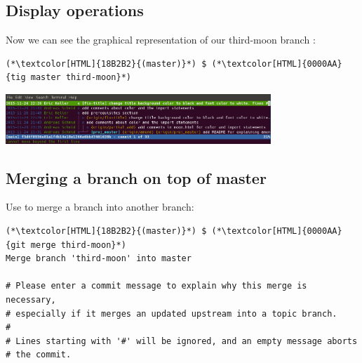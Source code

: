 \subsection{Display operations}
\begin{frame}[fragile]
  \subslidetitle

  Now we can see the graphical representation of our third-moon branch :
  \begin{lstlisting}
(*\textcolor[HTML]{18B2B2}{(master)}*) $ (*\textcolor[HTML]{0000AA}{tig master third-moon}*)
\end{lstlisting}

  \vspace{1em}

  \centerline{\includegraphics[width=10cm]{../screen/tig-fix-title-rebase-master.png}}

\end{frame}
\subsection{Merging a branch on top of master}
\begin{frame}[fragile]
  \subslidetitle

  Use  to merge a branch into another branch:

  \begin{lstlisting}
(*\textcolor[HTML]{18B2B2}{(master)}*) $ (*\textcolor[HTML]{0000AA}{git merge third-moon}*)
Merge branch 'third-moon' into master

# Please enter a commit message to explain why this merge is necessary,
# especially if it merges an updated upstream into a topic branch.
#
# Lines starting with '#' will be ignored, and an empty message aborts
# the commit.
\end{lstlisting}


\end{frame}

